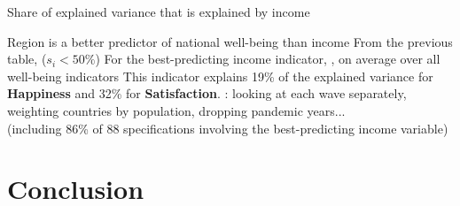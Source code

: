 \documentclass[aspectratio=169,xcolor=dvipsnames, 11pt,mathserif]{beamer}
\begin{document}
\begin{frame}{Share of explained variance that is explained by income \label{share_gdp} \hyperlink{share_gdp_add}{}}
    
\end{frame}

\begin{frame}{Region is a better predictor of national well-being than income}
    \bbvsp
    \ip From the previous table,  ($s_i < 50\%$)
    \ip For the best-predicting income indicator, , on average over all well-being indicators
    \ip This indicator explains 19\% of the explained variance for \textbf{Happiness} and 32\% for \textbf{Satisfaction}.
    \ip {}: looking at each wave separately, weighting countries by population, dropping pandemic years... \\(including 86\% of 88 specifications involving the best-predicting income variable) \hyperlink{share_gdp_add}{}
    \ee
\end{frame}

\section{Conclusion}
\end{document}
